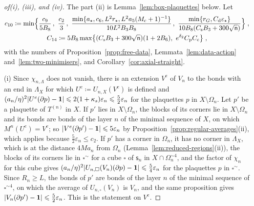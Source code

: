 \documentclass[11pt]{preprint}
\newcommand{\id}{\mathbf 1}
\DeclarePairedDelimiter{\abs}{\lvert}{\rvert}
\numberwithin{equation}{section}
\begin{document}
\begin{proof}[of\emph{(i)}, \emph{(iii)}, and \emph{(iv)}]
The part (ii) is Lemma~\ref{lem:box-plaquettes} below. Let
\begin{gather*}
    c_{10} \coloneqq \min\Bigl\{ \frac{c_9}{5B_8}\,,\ \frac{c_2}{3}\,,\ \frac{\min\{ a_\star, c_6, L^2r_\star, L^2a_5(M_{\mathrm c} + 1)^{-1} \}}{10L^2B_3B_8}\,,\ \frac{\min\{ r_G, C_{\mathrm d}\varepsilon_\star \}}{10B_8(C_{\mathrm s}B_3 + 300\sqrt{\mathsf n})} \Bigr\}\;,\\
    C_{14} \coloneqq 5B_8\max\bigl\{ (C_{\mathrm s}B_3 + 300\sqrt{\mathsf n})(1 + 2B_6),\ e^{\delta_2}C_{\mathrm p}C_{\mathrm c} \bigr\}\;,
\end{gather*}
with the numbers of Proposition~\ref{prop:free-data}, Lemmata~\ref{lem:data-action} and~\ref{lem:two-minimisers}, and Corollary~\ref{cor:axial-straight}.

(i) Since $\chi_{n,\Lambda}$ does not vanish, there is an extension $V^e$ of $V_n$ to the bonds with an end in $\Lambda_X$ for which $U^e \coloneqq U_{n,X}(V^e)$ is defined and $(a_n/\eta)^2\abs{U^e(\partial p) - \id} \leqslant 2(1 + \kappa_s)\varepsilon_n \leqslant \frac{5}{2}\varepsilon_n$ for the plaquettes $p$ in $X \setminus \Omega_n$. Let $p'$ be a plaquette of $T^{(n)}$ in $X$. If $p'$ lies in $X \setminus \Omega_n$, the blocks of its corners lie in $X \setminus \Omega_n$ and its bonds are bonds of the layer $n$ of the minimal sequence of $X$, on which $M^n(U^e) = V^e$; so $\abs{V^e(\partial p') - \id} \leqslant 5\varepsilon_n$ by Proposition~\ref{prop:regular-averages}(ii), which applies because $\frac{5}{2}\varepsilon_n \leqslant c_2$. If $p'$ has a corner in $\Omega_n$, it has no corner in $\Lambda_X$, which is at the distance $4Ma_n$ from $\Omega_n$ (Lemma~\ref{lem:reduced-regions}(ii)), the blocks of its corners lie in $\square^\sim$ for a cube $\square$ of $\mathsf s_n$ in $X \cap \Omega^{\sim4}_n$, and the factor of $\chi_n$ for this cube gives $(a_n/\eta)^2\abs{U_{n,\square}(V_n)(\partial p) - \id} \leqslant \frac{5}{4}\varepsilon_n$ for the plaquettes $p$ in $\square^\sim$. Since $R_n \geqslant L$, the bonds of $p'$ are bonds of the layer $n$ of the minimal sequence of $\square^{\sim4}$, on which the average of $U_{n,\square}(V_n)$ is $V_n$, and the same proposition gives $\abs{V_n(\partial p') - \id} \leqslant \frac{5}{2}\varepsilon_n$. This is the statement on $V^e$.


\end{proof}
\end{document}
